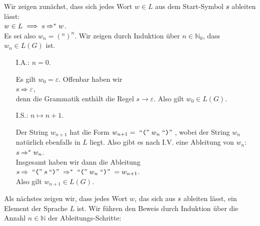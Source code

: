 \proof
Wir zeigen zun\"achst, dass sich jedes Wort $w \in L$ aus dem
Start-Symbol $\textsl{s}$ ableiten l\"asst:
\\[0.2cm]
\hspace*{1.3cm}
$w \in L \;\Longrightarrow\; \textsl{s} \Rightarrow^* w$.
\\[0.2cm]
Es sei also $w_n = (^n)^n$.  Wir zeigen durch Induktion \"uber $n \in \mathbb{N}_0$, dass $w_n \in L(G)$ ist.
\begin{enumerate}
\item[I.A.:] $n=0$.
  
            Es gilt $w_0 = \varepsilon$.  Offenbar haben wir
            \\[0.2cm]
            \hspace*{1.3cm}
            $\textsl{s} \Rightarrow \varepsilon$,
            \\[0.2cm]
            denn die Grammatik enth\"alt die Regel $s \rightarrow \varepsilon$.
            Also gilt $w_0 \in L(G)$.
\item[I.S.:] $n \mapsto n + 1$. 

            Der String $w_{n+1}$ hat die Form $w_{n+1} = \;\mbox{``\texttt{(}''}\;w_n\;\mbox{``\texttt{)}''}\;$, wobei
            der String $w_n$ nat\"urlich ebenfalls in $L$ liegt.
            Also gibt es nach I.V. eine Ableitung von $w_n$:
            \\[0.2cm]
            \hspace*{1.3cm}
            $\textsl{s} \Rightarrow^* w_n$.
            \\[0.2cm]
            Insgesamt haben wir dann die Ableitung
            \\[0.2cm]
            \hspace*{1.3cm}
            $\textsl{s} \Rightarrow \;\mbox{``\texttt{(}''}\;\textsl{s}\;\mbox{``\texttt{)}''}\; \Rightarrow^* \;\mbox{``\texttt{(}''}\; w_n \;\mbox{``\texttt{)}''}\; = w_{n+1}$.
            \\[0.2cm]
            Also gilt  $w_{n+1} \in L(G)$.
\end{enumerate}
Als n\"achstes zeigen wir, dass jedes Wort $w$, das sich aus $\textsl{s}$ ableiten l\"asst, ein Element
der Sprache $L$ ist.  Wir f\"uhren den Beweis durch Induktion \"uber die Anzahl $n \in \mathbb{N}$ der
Ableitungs-Schritte:

